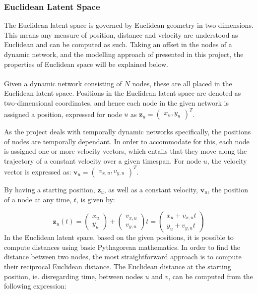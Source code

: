 \subsubsection{Euclidean Latent Space}
\label{sec:Method:LSM:EuclideanLatentSpace}
The Euclidean latent space is governed by Euclidean geometry in two dimensions.
This means any measure of position, distance and velocity are understood as Euclidean and can be computed as such. 
Taking an offset in the nodes of a dynamic network, and the modelling approach of presented in this project, the properties of Euclidean space will be explained below.
\\\\
Given a dynamic network consisting of $N$ nodes, these are all placed in the Euclidean latent space. 
Positions in the Euclidean latent space are denoted as two-dimensional coordinates, and hence each node in the given network is assigned a position, expressed for node $u$ as
$\textbf{z}_u = \begin{pmatrix}
x_u, y_u
\end{pmatrix}^T$.

As the project deals with temporally dynamic networks specifically, the positions of nodes are temporally dependant. 
In order to accommodate for this, each node is assigned one or more velocity vectors, which entails that they move along the trajectory of a constant velocity over a given timespan.
For node $u$, the velocity vector is expressed as:
$\textbf{v}_u = \begin{pmatrix}
v_{x,u}, v_{y,u}
\end{pmatrix}^T$.

By having a starting position, $\textbf{z}_u$, as well as a constant velocity, $\textbf{v}_u$, the position of a node at any time, $t$, is given by: 

\begin{equation}
    \textbf{z}_u(t) = \begin{pmatrix}
    x_u\\
    y_u
    \end{pmatrix}
    +
    \begin{pmatrix}
    v_{x,u}\\
    v_{y,u}
    \end{pmatrix}
    t
    = 
    \begin{pmatrix}
    x_u + v_{x,u}t\\
    y_u + v_{y,u}t
    \end{pmatrix}
\end{equation}
In the Euclidean latent space, based on the given positions, it is possible to compute distances using basic Pythagorean mathematics. 
In order to find the distance between two nodes, the most straightforward approach is to compute their reciprocal Euclidean distance.
The Euclidean distance at the starting position, ie. disregarding time, between nodes $u$ and $v$, can be computed from the following expression:

